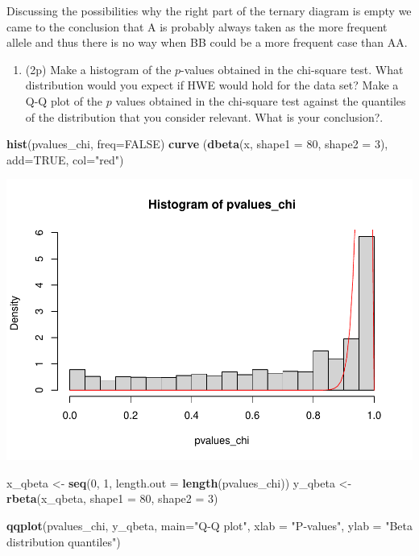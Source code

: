 \documentclass[
]{article}
\newenvironment{Shaded}{\begin{snugshade}}{\end{snugshade}}
\newcommand{\DataTypeTok}[1]{\textcolor[rgb]{0.13,0.29,0.53}{#1}}
\newcommand{\DecValTok}[1]{\textcolor[rgb]{0.00,0.00,0.81}{#1}}
\newcommand{\KeywordTok}[1]{\textcolor[rgb]{0.13,0.29,0.53}{\textbf{#1}}}
\newcommand{\NormalTok}[1]{#1}
\newcommand{\OtherTok}[1]{\textcolor[rgb]{0.56,0.35,0.01}{#1}}
\newcommand{\StringTok}[1]{\textcolor[rgb]{0.31,0.60,0.02}{#1}}
\providecommand{\tightlist}{%
  \setlength{\itemsep}{0pt}\setlength{\parskip}{0pt}}
\begin{document}
Discussing the possibilities why the right part of the ternary diagram
is empty we came to the conclusion that A is probably always taken as
the more frequent allele and thus there is no way when BB could be a
more frequent case than AA.

\begin{enumerate}
\def\labelenumi{\arabic{enumi}.}
\setcounter{enumi}{13}
\tightlist
\item
  (2p) Make a histogram of the \(p\)-values obtained in the chi-square
  test. What distribution would you expect if HWE would hold for the
  data set? Make a Q-Q plot of the \(p\) values obtained in the
  chi-square test against the quantiles of the distribution that you
  consider relevant. What is your conclusion?.
\end{enumerate}

\begin{Shaded}
\begin{Highlighting}[]
\KeywordTok{hist}\NormalTok{(pvalues_chi, }\DataTypeTok{freq=}\OtherTok{FALSE}\NormalTok{)}
\KeywordTok{curve}\NormalTok{ (}\KeywordTok{dbeta}\NormalTok{(x, }\DataTypeTok{shape1 =} \DecValTok{80}\NormalTok{, }\DataTypeTok{shape2 =} \DecValTok{3}\NormalTok{), }\DataTypeTok{add=}\OtherTok{TRUE}\NormalTok{, }\DataTypeTok{col=}\StringTok{"red"}\NormalTok{)}
\end{Highlighting}
\end{Shaded}

\includegraphics{P022020_HWE_files/figure-latex/14th-1.pdf}

\begin{Shaded}
\begin{Highlighting}[]
\NormalTok{x_qbeta <-}\StringTok{ }\KeywordTok{seq}\NormalTok{(}\DecValTok{0}\NormalTok{, }\DecValTok{1}\NormalTok{, }\DataTypeTok{length.out =} \KeywordTok{length}\NormalTok{(pvalues_chi))}
\NormalTok{y_qbeta <-}\StringTok{ }\KeywordTok{rbeta}\NormalTok{(x_qbeta, }\DataTypeTok{shape1 =} \DecValTok{80}\NormalTok{, }\DataTypeTok{shape2 =} \DecValTok{3}\NormalTok{)}

\KeywordTok{qqplot}\NormalTok{(pvalues_chi, y_qbeta, }\DataTypeTok{main=}\StringTok{"Q-Q plot"}\NormalTok{, }\DataTypeTok{xlab =} \StringTok{"P-values"}\NormalTok{, }\DataTypeTok{ylab =} \StringTok{"Beta distribution quantiles"}\NormalTok{)}
\end{Highlighting}
\end{Shaded}
\end{document}
